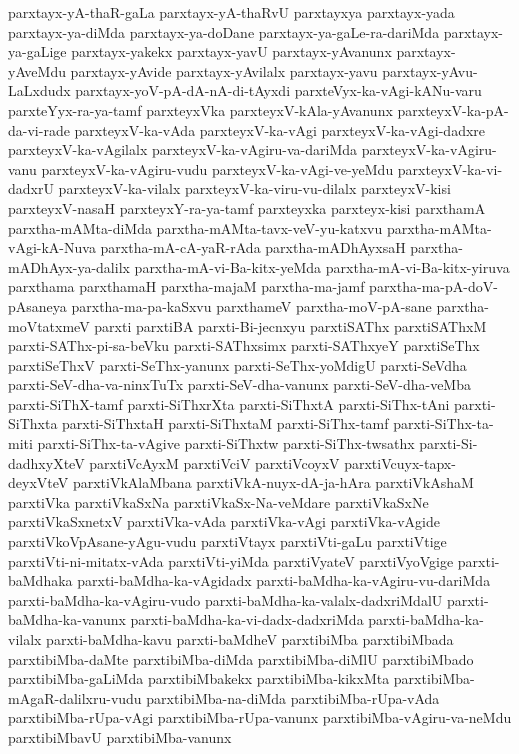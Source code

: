 {parxtayx-yA-thaR-gaLa
parxtayx-yA-thaRvU
parxtayxya
parxtayx-yada
parxtayx-ya-diMda
parxtayx-ya-doDane
parxtayx-ya-gaLe-ra-dariMda
parxtayx-ya-gaLige
parxtayx-yakekx
parxtayx-yavU
parxtayx-yAvanunx
parxtayx-yAveMdu
parxtayx-yAvide
parxtayx-yAvilalx
parxtayx-yavu
parxtayx-yAvu-LaLxdudx
parxtayx-yoV-pA-dA-nA-di-tAyxdi
parxteVyx-ka-vAgi-kANu-varu
parxteYyx-ra-ya-tamf
parxteyxVka
parxteyxV-kAla-yAvanunx
parxteyxV-ka-pA-da-vi-rade
parxteyxV-ka-vAda
parxteyxV-ka-vAgi
parxteyxV-ka-vAgi-dadxre
parxteyxV-ka-vAgilalx
parxteyxV-ka-vAgiru-va-dariMda
parxteyxV-ka-vAgiru-vanu
parxteyxV-ka-vAgiru-vudu
parxteyxV-ka-vAgi-ve-yeMdu
parxteyxV-ka-vi-dadxrU
parxteyxV-ka-vilalx
parxteyxV-ka-viru-vu-dilalx
parxteyxV-kisi
parxteyxV-nasaH
parxteyxY-ra-ya-tamf
parxteyxka
parxteyx-kisi
parxthamA
parxtha-mAMta-diMda
parxtha-mAMta-tavx-veV-yu-katxvu
parxtha-mAMta-vAgi-kA-Nuva
parxtha-mA-cA-yaR-rAda
parxtha-mADhAyxsaH
parxtha-mADhAyx-ya-dalilx
parxtha-mA-vi-Ba-kitx-yeMda
parxtha-mA-vi-Ba-kitx-yiruva
parxthama
parxthamaH
parxtha-majaM
parxtha-ma-jamf
parxtha-ma-pA-doV-pAsaneya
parxtha-ma-pa-kaSxvu
parxthameV
parxtha-moV-pA-sane
parxtha-moVtatxmeV
parxti
parxtiBA
parxti-Bi-jecnxyu
parxtiSAThx
parxtiSAThxM
parxti-SAThx-pi-sa-beVku
parxti-SAThxsimx
parxti-SAThxyeY
parxtiSeThx
parxtiSeThxV
parxti-SeThx-yanunx
parxti-SeThx-yoMdigU
parxti-SeVdha
parxti-SeV-dha-va-ninxTuTx
parxti-SeV-dha-vanunx
parxti-SeV-dha-veMba
parxti-SiThX-tamf
parxti-SiThxrXta
parxti-SiThxtA
parxti-SiThx-tAni
parxti-SiThxta
parxti-SiThxtaH
parxti-SiThxtaM
parxti-SiThx-tamf
parxti-SiThx-ta-miti
parxti-SiThx-ta-vAgive
parxti-SiThxtw
parxti-SiThx-twsathx
parxti-Si-dadhxyXteV
parxtiVcAyxM
parxtiVciV
parxtiVcoyxV
parxtiVcuyx-tapx-deyxVteV
parxtiVkAlaMbana
parxtiVkA-nuyx-dA-ja-hAra
parxtiVkAshaM
parxtiVka
parxtiVkaSxNa
parxtiVkaSx-Na-veMdare
parxtiVkaSxNe
parxtiVkaSxnetxV
parxtiVka-vAda
parxtiVka-vAgi
parxtiVka-vAgide
parxtiVkoVpAsane-yAgu-vudu
parxtiVtayx
parxtiVti-gaLu
parxtiVtige
parxtiVti-ni-mitatx-vAda
parxtiVti-yiMda
parxtiVyateV
parxtiVyoVgige
parxti-baMdhaka
parxti-baMdha-ka-vAgidadx
parxti-baMdha-ka-vAgiru-vu-dariMda
parxti-baMdha-ka-vAgiru-vudo
parxti-baMdha-ka-valalx-dadxriMdalU
parxti-baMdha-ka-vanunx
parxti-baMdha-ka-vi-dadx-dadxriMda
parxti-baMdha-ka-vilalx
parxti-baMdha-kavu
parxti-baMdheV
parxtibiMba
parxtibiMbada
parxtibiMba-daMte
parxtibiMba-diMda
parxtibiMba-diMlU
parxtibiMbado
parxtibiMba-gaLiMda
parxtibiMbakekx
parxtibiMba-kikxMta
parxtibiMba-mAgaR-dalilxru-vudu
parxtibiMba-na-diMda
parxtibiMba-rUpa-vAda
parxtibiMba-rUpa-vAgi
parxtibiMba-rUpa-vanunx
parxtibiMba-vAgiru-va-neMdu
parxtibiMbavU
parxtibiMba-vanunx
}
